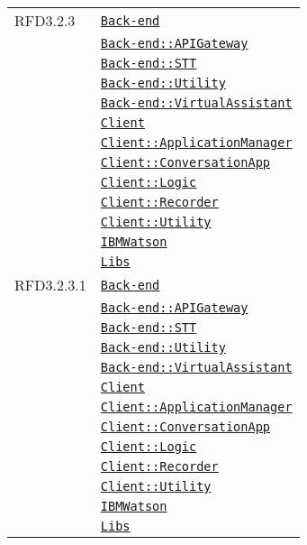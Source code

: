 \begin{longtable}{|>{\centering}m{3cm}|m{10cm}<{\centering}|}
RFD3.2.3 & \hyperref[Back-end]{\texttt{Back-end}}\\
& \hyperref[Back-end::APIGateway]{\texttt{Back-end::APIGateway}}\\
& \hyperref[Back-end::STT]{\texttt{Back-end::STT}}\\
& \hyperref[Back-end::Utility]{\texttt{Back-end::Utility}}\\
& \hyperref[Back-end::VirtualAssistant]{\texttt{Back-end::VirtualAssistant}}\\
& \hyperref[Client]{\texttt{Client}}\\
& \hyperref[Client::ApplicationManager]{\texttt{Client::ApplicationManager}}\\
& \hyperref[Client::ConversationApp]{\texttt{Client::ConversationApp}}\\
& \hyperref[Client::Logic]{\texttt{Client::Logic}}\\
& \hyperref[Client::Recorder]{\texttt{Client::Recorder}}\\
& \hyperref[Client::Utility]{\texttt{Client::Utility}}\\
& \hyperref[IBMWatson]{\texttt{IBMWatson}}\\
& \hyperref[Libs]{\texttt{Libs}}\\ \hline

RFD3.2.3.1 & \hyperref[Back-end]{\texttt{Back-end}}\\
& \hyperref[Back-end::APIGateway]{\texttt{Back-end::APIGateway}}\\
& \hyperref[Back-end::STT]{\texttt{Back-end::STT}}\\
& \hyperref[Back-end::Utility]{\texttt{Back-end::Utility}}\\
& \hyperref[Back-end::VirtualAssistant]{\texttt{Back-end::VirtualAssistant}}\\
& \hyperref[Client]{\texttt{Client}}\\
& \hyperref[Client::ApplicationManager]{\texttt{Client::ApplicationManager}}\\
& \hyperref[Client::ConversationApp]{\texttt{Client::ConversationApp}}\\
& \hyperref[Client::Logic]{\texttt{Client::Logic}}\\
& \hyperref[Client::Recorder]{\texttt{Client::Recorder}}\\
& \hyperref[Client::Utility]{\texttt{Client::Utility}}\\
& \hyperref[IBMWatson]{\texttt{IBMWatson}}\\
& \hyperref[Libs]{\texttt{Libs}}\\ \hline


\end{longtable}
